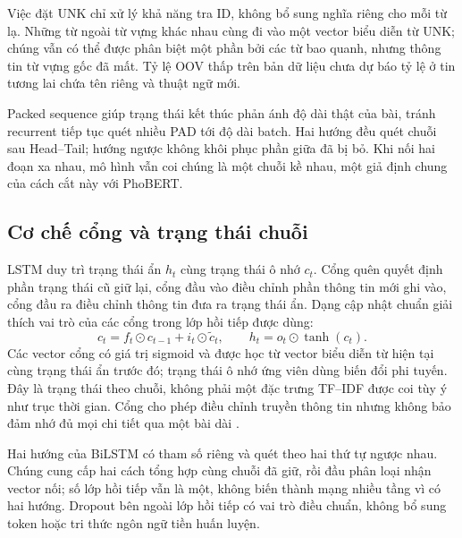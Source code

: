 Việc đặt UNK chỉ xử lý khả năng tra ID, không bổ sung nghĩa riêng cho mỗi từ lạ. Những từ ngoài từ vựng khác nhau cùng đi vào một vector biểu diễn từ UNK; chúng vẫn có thể được phân biệt một phần bởi các từ bao quanh, nhưng thông tin từ vựng gốc đã mất. Tỷ lệ OOV thấp trên bản dữ liệu chưa dự báo tỷ lệ ở tin tương lai chứa tên riêng và thuật ngữ mới.

Packed sequence giúp trạng thái kết thúc phản ánh độ dài thật của bài, tránh recurrent tiếp tục quét nhiều PAD tới độ dài batch. Hai hướng đều quét chuỗi sau Head--Tail; hướng ngược không khôi phục phần giữa đã bị bỏ. Khi nối hai đoạn xa nhau, mô hình vẫn coi chúng là một chuỗi kề nhau, một giả định chung của cách cắt này với PhoBERT.



\subsection{Cơ chế cổng và trạng thái chuỗi}
LSTM duy trì trạng thái ẩn $h_t$ cùng trạng thái ô nhớ $c_t$. Cổng quên quyết định phần trạng thái cũ giữ lại, cổng đầu vào điều chỉnh phần thông tin mới ghi vào, cổng đầu ra điều chỉnh thông tin đưa ra trạng thái ẩn. Dạng cập nhật chuẩn giải thích vai trò của các cổng trong lớp hồi tiếp được dùng:
\begin{equation}c_t=f_t\odot c_{t-1}+i_t\odot\widetilde c_t,\qquad h_t=o_t\odot\tanh(c_t).\end{equation}
Các vector cổng có giá trị sigmoid và được học từ vector biểu diễn từ hiện tại cùng trạng thái ẩn trước đó; trạng thái ô nhớ ứng viên dùng biến đổi phi tuyến. Đây là trạng thái theo chuỗi, không phải một đặc trưng TF--IDF được coi tùy ý như trục thời gian. Cổng cho phép điều chỉnh truyền thông tin nhưng không bảo đảm nhớ đủ mọi chi tiết qua một bài dài \citep{kowsari2019}.

Hai hướng của BiLSTM có tham số riêng và quét theo hai thứ tự ngược nhau. Chúng cung cấp hai cách tổng hợp cùng chuỗi đã giữ, rồi đầu phân loại nhận vector nối; số lớp hồi tiếp vẫn là một, không biến thành mạng nhiều tầng vì có hai hướng. Dropout bên ngoài lớp hồi tiếp có vai trò điều chuẩn, không bổ sung token hoặc tri thức ngôn ngữ tiền huấn luyện.


